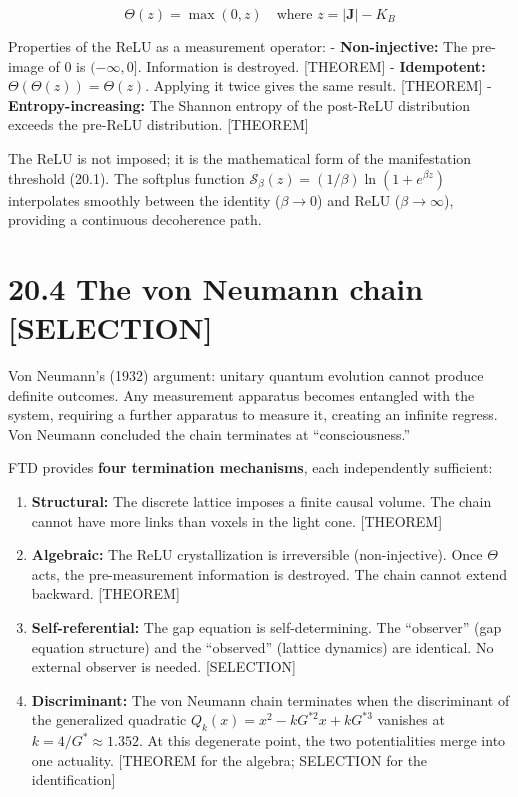 \documentclass[
  11pt,
  letterpaper,
  twoside,
  openright]{book}
\begin{document}
\[
\Theta(z) = \max(0, z) \quad \text{where } z = |\mathbf{J}| - K_B
\tag{20.1}
\]

Properties of the ReLU as a measurement operator: -
\textbf{Non-injective:} The pre-image of \(0\) is \((-\infty, 0]\).
Information is destroyed. {[}THEOREM{]} - \textbf{Idempotent:}
\(\Theta(\Theta(z)) = \Theta(z)\). Applying it twice gives the same
result. {[}THEOREM{]} - \textbf{Entropy-increasing:} The Shannon entropy
of the post-ReLU distribution exceeds the pre-ReLU distribution.
{[}THEOREM{]}

The ReLU is not imposed; it is the mathematical form of the
manifestation threshold (20.1). The softplus function
\(\mathcal{S}_\beta(z) = (1/\beta)\ln(1 + e^{\beta z})\) interpolates
smoothly between the identity (\(\beta \to 0\)) and ReLU
(\(\beta \to \infty\)), providing a continuous decoherence path.

\section{20.4 The von Neumann chain
{[}SELECTION{]}}\label{the-von-neumann-chain-selection}

Von Neumann's (1932) argument: unitary quantum evolution cannot produce
definite outcomes. Any measurement apparatus becomes entangled with the
system, requiring a further apparatus to measure it, creating an
infinite regress. Von Neumann concluded the chain terminates at
``consciousness.''

FTD provides \textbf{four termination mechanisms}, each independently
sufficient:

\begin{enumerate}
\def\labelenumi{\arabic{enumi}.}
\item
  \textbf{Structural:} The discrete lattice imposes a finite causal
  volume. The chain cannot have more links than voxels in the light
  cone. {[}THEOREM{]}
\item
  \textbf{Algebraic:} The ReLU crystallization is irreversible
  (non-injective). Once \(\Theta\) acts, the pre-measurement information
  is destroyed. The chain cannot extend backward. {[}THEOREM{]}
\item
  \textbf{Self-referential:} The gap equation is self-determining. The
  ``observer'' (gap equation structure) and the ``observed'' (lattice
  dynamics) are identical. No external observer is needed.
  {[}SELECTION{]}
\item
  \textbf{Discriminant:} The von Neumann chain terminates when the
  discriminant of the generalized quadratic
  \(Q_k(x) = x^2 - kG^{*2}x + kG^{*3}\) vanishes at
  \(k = 4/G^* \approx 1.352\). At this degenerate point, the two
  potentialities merge into one actuality. {[}THEOREM for the algebra;
  SELECTION for the identification{]}
\end{enumerate}
\end{document}
